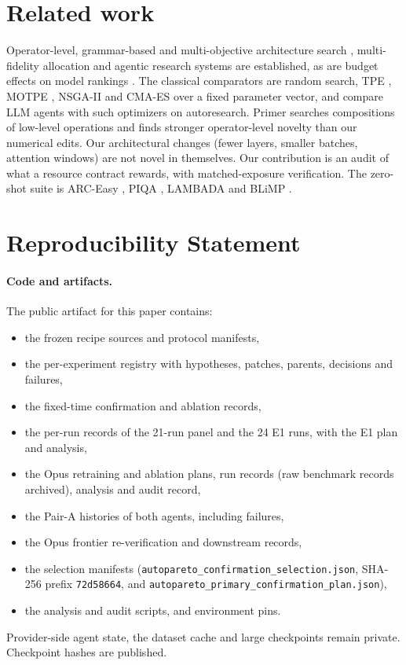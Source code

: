 \documentclass{article}
\newif\ifshowhumanmarkers \showhumanmarkersfalse
\newcommand{\releasepending}{\ifshowhumanmarkers{\color{humanframe}\sffamily\scriptsize\bfseries[RELEASE PENDING]}\ \fi}
\begin{document}
\section{Related work}\label{app:related}
Operator-level, grammar-based and multi-objective architecture search \citep{primer,einspace,mote,monaq}, multi-fidelity allocation \citep{hyperband,bohb} and agentic research systems \citep{autodiscovery,mlestar,airesearcher,mledojo} are established, as are budget effects on model rankings \citep{dehghani2022efficiency,geiping2023cramming,hoffmann2022chinchilla}. The classical comparators are random search, TPE \citep{bergstra2011tpe}, MOTPE \citep{ozaki2020motpe}, NSGA-II \citep{deb2002nsga2} and CMA-ES \citep{hansen2001cmaes} over a fixed parameter vector, and \citet{ferreira} compare LLM agents with such optimizers on autoresearch. Primer searches compositions of low-level operations and finds stronger operator-level novelty than our numerical edits. Our architectural changes (fewer layers, smaller batches, attention windows) are not novel in themselves. Our contribution is an audit of what a resource contract rewards, with matched-exposure verification. The zero-shot suite is ARC-Easy \citep{clark2018arc}, PIQA \citep{bisk2020piqa}, LAMBADA \citep{paperno2016lambada} and BLiMP \citep{warstadt2020blimp}.

\section{Reproducibility Statement}\label{app:repro}
\paragraph{Code and artifacts.} \releasepending The public artifact for this paper contains:
{\setlength{\leftmargini}{1.2em}\begin{itemize}\setlength{\itemsep}{0pt}\setlength{\parskip}{0pt}\setlength{\topsep}{2pt}
\item the frozen recipe sources and protocol manifests,
\item the per-experiment registry with hypotheses, patches, parents, decisions and failures,
\item the fixed-time confirmation and ablation records,
\item the per-run records of the 21-run panel and the 24 E1 runs, with the E1 plan and analysis,
\item the Opus retraining and ablation plans, run records (raw benchmark records archived), analysis and audit record,
\item the Pair-A histories of both agents, including failures,
\item the Opus frontier re-verification and downstream records,
\item the selection manifests (\texttt{autopareto\_confirmation\_selection.json}, SHA-256 prefix \texttt{72d58664}, and \texttt{autopareto\_primary\_confirmation\_plan.json}),
\item the analysis and audit scripts, and environment pins.
\end{itemize}}
Provider-side agent state, the dataset cache and large checkpoints remain private. Checkpoint hashes are published.
\end{document}
